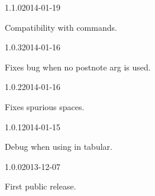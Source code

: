 \documentclass{ltxdockit}[2011/03/25]
\begin{document}
\begin{changelog}
\begin{release}{1.1.0}{2014-01-19}
\item Compatibility with  commands.
\end{release}

\begin{release}{1.0.3}{2014-01-16}
\item Fixes bug when no postnote arg is used.
\end{release}

\begin{release}{1.0.2}{2014-01-16}
\item Fixes spurious spaces.
\end{release}

\begin{release}{1.0.1}{2014-01-15}
\item Debug when using in tabular.
\end{release}


\begin{release}{1.0.0}{2013-12-07}
\item First public release.
\end{release}

\end{changelog}
\end{document}
